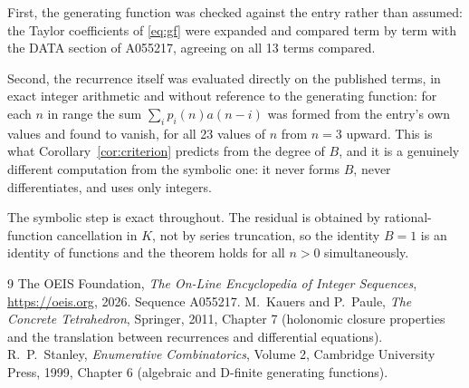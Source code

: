 \documentclass[11pt,a4paper]{article}
\theoremstyle{plain}
\theoremstyle{definition}
\begin{document}
First, the generating function was checked against the entry rather than assumed: the
Taylor coefficients of \eqref{eq:gf} were expanded and compared term by term with the DATA
section of A055217, agreeing on all 13 terms compared.

Second, the recurrence itself was evaluated directly on the published terms, in exact
integer arithmetic and without reference to the generating function: for each $n$ in range
the sum $\sum_{i}p_{i}(n)a(n-i)$ was formed from the entry's own values and found to
vanish, for all 23 values of $n$ from $n=3$ upward. This is what
Corollary~\ref{cor:criterion} predicts from the degree of $B$, and it is a genuinely
different computation from the symbolic one: it never forms $B$, never differentiates, and
uses only integers.

The symbolic step is exact throughout. The residual is obtained by rational-function
cancellation in $K$, not by series truncation, so the identity $B=1$ is an
identity of functions and the theorem holds for all $n>0$ simultaneously.

\begin{thebibliography}{9}
 The OEIS Foundation, \emph{The On-Line Encyclopedia of Integer Sequences},
\url{https://oeis.org}, 2026. Sequence A055217.
 M.~Kauers and P.~Paule, \emph{The Concrete Tetrahedron}, Springer, 2011,
Chapter 7 (holonomic closure properties and the translation between recurrences and
differential equations).
 R.~P.~Stanley, \emph{Enumerative Combinatorics}, Volume 2, Cambridge
University Press, 1999, Chapter 6 (algebraic and D-finite generating functions).
\end{thebibliography}
\end{document}

